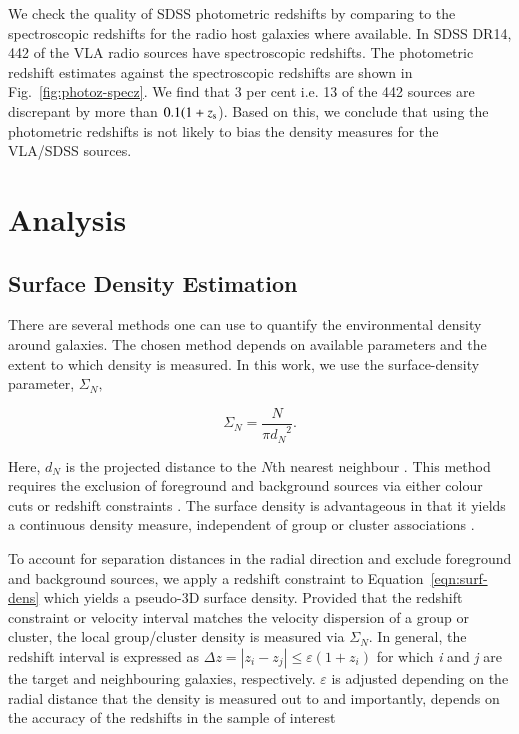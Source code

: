 We check the quality of SDSS photometric redshifts by comparing to the spectroscopic redshifts for the radio host galaxies where available. In SDSS DR14, 442 of the VLA radio sources have  spectroscopic redshifts. The photometric redshift estimates against the spectroscopic redshifts are shown in Fig.~\ref{fig:photoz-specz}. We find that 3 per cent i.e. 13 of the 442 sources are discrepant by more than $0.1(1+z_{\rm s}$). Based on this, we conclude that using the photometric redshifts is not likely to bias the density measures for the VLA/SDSS sources.

\section{Analysis}\label{section-3}

\subsection{Surface Density Estimation}\label{section:env-quant}
There are several methods one can use to quantify the environmental density around galaxies. The chosen method depends on available parameters and the extent to which density is measured. In this work, we use the surface-density parameter, $\Sigma_N,$ 

\begin{equation}\label{eqn:surf-dens}
\Sigma_N = \frac{N}{\pi{d_N}^2}.
\end{equation}

Here, $d_N$ is the projected distance to the $N$th nearest neighbour \citep{dressler1980,gomez2003,mateus2004}. This method requires the exclusion of foreground and background sources via either colour cuts or redshift constraints \citep{kauffman2004,cappellari2011,karouzos2014a,karouzos2014c}. The surface density is advantageous in that it yields a continuous density measure, independent of group or cluster associations \citep{cooper2005}.

To account for separation distances in the radial direction and exclude foreground and background sources, we apply a redshift constraint to Equation~\ref{eqn:surf-dens} which yields a pseudo-3D surface density. Provided that the redshift constraint or velocity interval matches the velocity dispersion of a group or cluster, the local group/cluster density is measured via $\Sigma_N.$ In general, the redshift interval is expressed as $\Delta z = \left| z_i - z_j \right| \leq \varepsilon(1 + z_i)$ for which \textit{i} and \textit{j} are the target and neighbouring galaxies, respectively. $\varepsilon$ is adjusted depending on the radial distance that the density is measured out to and importantly, depends on the accuracy of the redshifts in the sample of interest  

